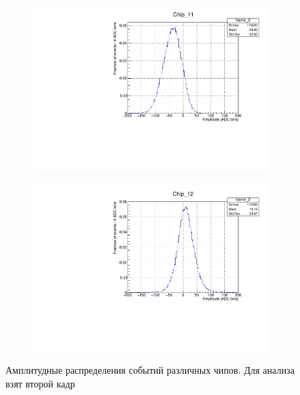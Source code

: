 \documentclass[12pt]{article}
\begin{document}
\begin{figure}[h!]
\begin{subfigure}[t]{0.45\textwidth}
	\end{subfigure}
	\begin{subfigure}[t]{0.45\textwidth}
		\centering
		\includegraphics[width=\textwidth]{Chip_11_amp_hist}
	\end{subfigure}
	\begin{subfigure}[t]{0.45\textwidth}
		\centering
		\includegraphics[width=\textwidth]{Chip_12_amp_hist}
	\end{subfigure}
	\caption{Амплитудные распределения событий различных чипов. Для анализа взят второй кадр}
	\label{fig:h_noise}
\end{figure}
\end{document}
